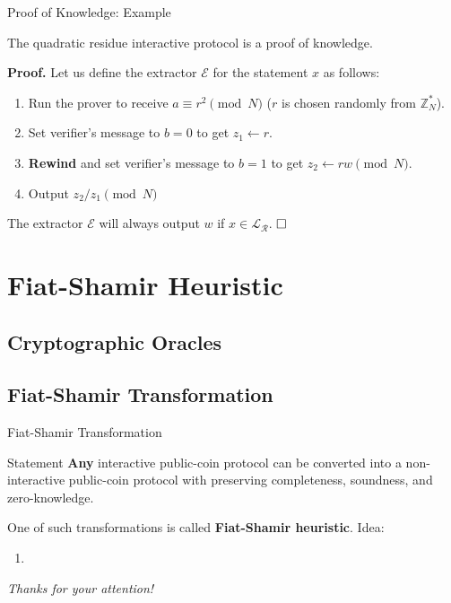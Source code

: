 \documentclass[xcolor={usenames,dvipsnames}]{beamer}
\begin{document}
    \begin{frame}{Proof of Knowledge: Example}
        \begin{lemma}
            The quadratic residue interactive protocol is a proof of knowledge.
        \end{lemma}
        
        \textbf{Proof.} Let us define the extractor $\mathcal{E}$ for the statement $x$ as follows:
        \begin{enumerate}
            \item Run the prover to receive $a \equiv r^2 \pmod{N}$ ($r$ is chosen randomly from $\mathbb{Z}_N^*$).
            \item Set verifier's message to $b=0$ to get $z_1 \gets r$.
            \item \textbf{Rewind} and set verifier's message to $b=1$ to get $z_2 \gets rw \pmod{N}$.
            \item Output $z_2/z_1 \pmod{N}$
        \end{enumerate}
        
        The extractor $\mathcal{E}$ will always output $w$ if $x \in \mathcal{L}_{\mathcal{R}}$. $\hfill\Box$
    \end{frame}

    \section{Fiat-Shamir Heuristic}
    \subsection{Cryptographic Oracles}
    \begin{frame}
        
    \end{frame}
    \subsection{Fiat-Shamir Transformation}
    \begin{frame}{Fiat-Shamir Transformation}
        \begin{block}{Statement}
            \textbf{Any} interactive public-coin protocol can be converted into a non-interactive public-coin protocol with preserving completeness, soundness, and zero-knowledge.
        \end{block}

        One of such transformations is called \textbf{Fiat-Shamir heuristic}. Idea:
        \begin{enumerate}
            \item 
        \end{enumerate}
    \end{frame}

	\begin{frame}{}
      \centering \Large
      \emph{Thanks for your attention!}
    \end{frame}
\end{document}
